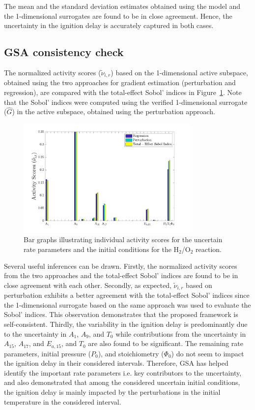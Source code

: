 %
The mean and the standard deviation estimates obtained using the model and the 1-dimensional surrogates
are found to be in close agreement. Hence, the uncertainty in the ignition delay is accurately captured 
in both cases.

\subsection{GSA consistency check}

The normalized activity scores ($\tilde{\nu}_{i,r}$) based on the 1-dimensional active subspace, obtained
using the two approaches for gradient estimation (perturbation and regression),
are compared with the 
total-effect Sobol' indices
in Figure~\ref{fig:as_36D}. Note that the Sobol' indices were computed using the verified
1-dimensional surrogate ($\hat{G}$) in the active subspace, obtained using the 
perturbation approach. 
%
\begin{figure}[htbp]
 \begin{center}
  \includegraphics[width=0.8\textwidth]{./Figures/as_36Dp2_rev2}
\caption{Bar graphs illustrating individual activity scores for the uncertain 
rate parameters and the initial conditions for the H$_2$/O$_2$ reaction.}
\label{fig:as_36D}
\end{center}
\end{figure}
%
Several useful inferences can be drawn. Firstly, the normalized activity scores from the two approaches
and the total-effect Sobol' indices are found to be in close agreement with each other. Secondly, as expected, 
$\tilde{\nu}_{i,r}$ based on perturbation exhibits a better agreement with the total-effect Sobol' indices since
the 1-dimensional
surrogate based on the same approach was used to evaluate the Sobol' indices. This observation demonstrates
that the proposed framework is self-consistent. Thirdly, the variability in the ignition delay is predominantly due
to the uncertainty in $A_1$, $A_9$, and $T_0$ while contributions from the uncertainty in $A_{15}$, $A_{17}$, and
$E_{a,15}$, and $T_0$ are also found to be significant. The remaining rate parameters, initial pressure ($P_0$),
and  stoichiometry ($\Phi_0$) do not seem to impact the ignition delay in their considered intervals. 
Therefore, GSA has helped
identify the important rate parameters i.e. key contributors to the uncertainty, and also demonstrated that among the 
considered uncertain initial conditions, the ignition delay is mainly impacted by the perturbations in the initial 
temperature in the considered interval.


